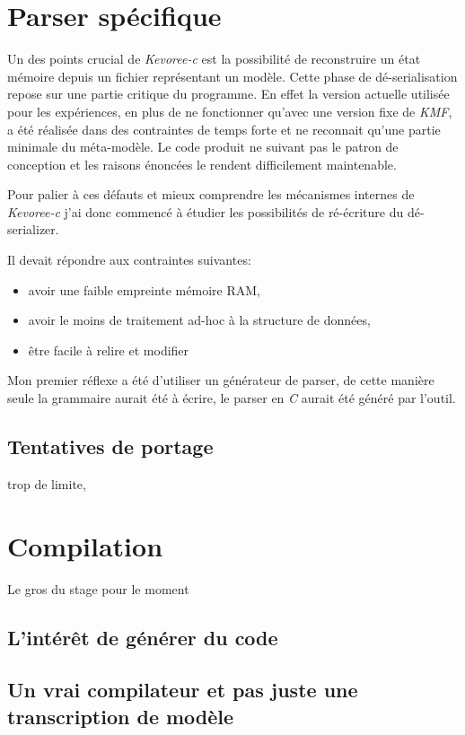 \section{Parser spécifique}

Un des points crucial de \emph{Kevoree-c} est la possibilité de reconstruire un état mémoire depuis un fichier représentant un modèle. Cette phase de dé-serialisation repose sur une partie critique du programme. En effet la version actuelle utilisée pour les expériences, en plus de ne fonctionner qu'avec une version fixe de \emph{KMF}, a été réalisée dans des contraintes de temps forte et ne reconnait qu'une partie minimale du méta-modèle. Le code produit ne suivant pas le patron de conception et les raisons énoncées le rendent difficilement maintenable.

Pour palier à ces défauts et mieux comprendre les mécanismes internes de \emph{Kevoree-c} j'ai donc commencé à étudier les possibilités de ré-écriture du dé-serializer.

Il devait répondre aux contraintes suivantes:

\begin{itemize}
\item avoir une faible empreinte mémoire RAM,
\item avoir le moins de traitement ad-hoc à la structure de données,
\item être facile à relire et modifier
\end{itemize}

Mon premier réflexe a été d'utiliser un générateur de parser, de cette manière seule la grammaire aurait été à écrire, le parser en \emph{C} aurait été généré par l'outil. 


\subsection{Tentatives de portage}

trop de limite,
\section{Compilation}

Le gros du stage pour le moment

\subsection{L'intérêt de générer du code}

\subsection{Un vrai compilateur et pas juste une transcription de modèle}